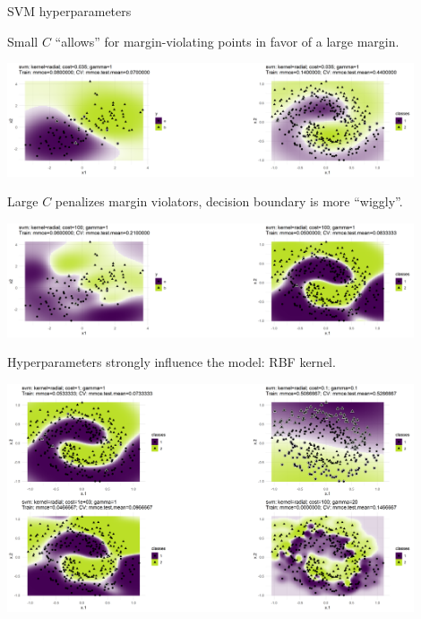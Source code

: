 \begin{vbframe}{SVM hyperparameters}

Small $C$ \enquote{allows} for margin-violating points in favor of a large margin. 


\begin{center}
\includegraphics[width=0.9\textwidth]{figure/svm_rbf_cost_1.png}
\end{center}


Large $C$ penalizes margin violators, decision boundary is more \enquote{wiggly}. 


\begin{center}
\includegraphics[width=0.9\textwidth]{figure/svm_rbf_cost_2.png}
\end{center}


\framebreak

Hyperparameters strongly influence the model: RBF kernel.

\begin{center}
\includegraphics[width=0.9\textwidth]{figure/svm_rbf_hyperparams.png}
\end{center}


\framebreak


\end{vbframe}
